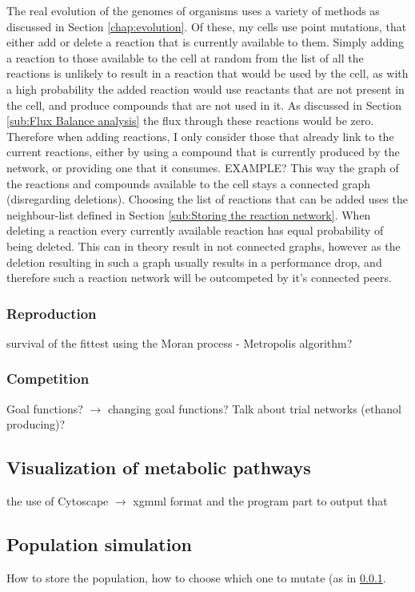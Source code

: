 \documentclass[10pt,a4paper]{article}
\begin{document}
	The real evolution of the genomes of organisms uses a variety of methods as discussed in Section \ref{chap:evolution}. Of these, my cells use point mutations, that either add or delete a reaction that is currently available to them. Simply adding a reaction to those available to the cell at random from the list of all the reactions is unlikely to result in a reaction that would be used by the cell, as with a high probability the added reaction would use reactants that are not present in the cell, and produce compounds that are not used in it. As discussed in Section \ref{sub:Flux Balance analysis} the flux through these reactions would be zero. Therefore when adding reactions, I only consider those that already link to the current reactions, either by using a compound that is currently produced by the network, or providing one that it consumes. EXAMPLE? This way the graph of the reactions and compounds available to the cell stays a connected graph (disregarding deletions). Choosing the list of reactions that can be added uses the neighbour-list defined in Section \ref{sub:Storing the reaction network}. When deleting a reaction every currently available reaction has equal probability of being deleted. This can in theory result in not connected graphs, however as the deletion resulting in such a graph usually results in a performance drop, and therefore such a reaction network will be outcompeted by it's connected peers. 
\subsubsection{Reproduction}
\label{ssub:Reproduction}
survival of the fittest using the Moran process - Metropolis algorithm?

\subsubsection{Competition}
\label{ssub:Competition}
Goal functions? $\rightarrow$ changing goal functions? Talk about trial networks (ethanol producing)?

\subsection{Visualization of metabolic pathways}
\label{sub:visualization}

the use of Cytoscape $\rightarrow$ xgmml format and the  program part to output that

\subsection{Population simulation}
\label{sub:population_simulation}
How to store the population, how to choose which one to mutate (as in \ref{ssub:Reproduction}. 
\end{document}
